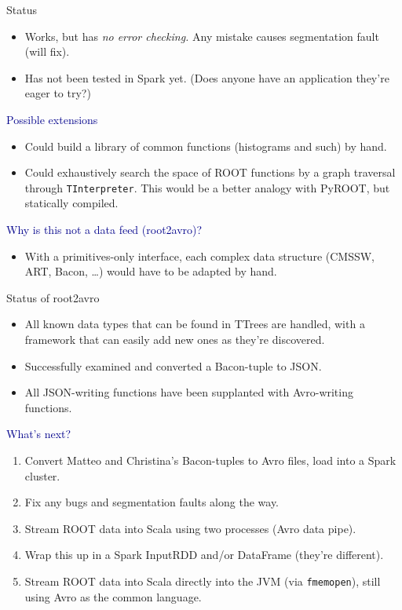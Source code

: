 \documentclass{beamer}
\begin{document}
\begin{frame}{Status}
\begin{itemize}
\item Works, but has {\it no error checking.} Any mistake causes segmentation fault (will fix).
\item Has not been tested in Spark yet. (Does anyone have an application they're eager to try?)
\end{itemize}

\vfill
\vfill
\hspace{-0.83 cm} \textcolor{darkblue}{\Large Possible extensions}
\begin{itemize}
\item Could build a library of common functions (histograms and such) by hand.
\item Could exhaustively search the space of ROOT functions by a graph traversal through {\tt TInterpreter}. This would be a better analogy with PyROOT, but statically compiled.
\end{itemize}

\vfill
\vfill
\hspace{-0.83 cm} \textcolor{darkblue}{\Large Why is this not a data feed (root2avro)?}
\begin{itemize}
\item With a primitives-only interface, each complex data structure (CMSSW, ART, Bacon, \ldots) would have to be adapted by hand.
\end{itemize}
\end{frame}

\begin{frame}{Status of root2avro}
\begin{itemize}
\item All known data types that can be found in TTrees are handled, with a framework that can easily add new ones as they're discovered.
\item Successfully examined and converted a Bacon-tuple to JSON.
\item All JSON-writing functions have been supplanted with Avro-writing functions.
\end{itemize}

\vfill
\vfill
\hspace{-0.83 cm} \textcolor{darkblue}{\Large What's next?}
\begin{enumerate}
\item Convert Matteo and Christina's Bacon-tuples to Avro files, load into a Spark cluster.
\item Fix any bugs and segmentation faults along the way.
\item Stream ROOT data into Scala using two processes (Avro data pipe).
\item Wrap this up in a Spark InputRDD and/or DataFrame (they're different).
\item Stream ROOT data into Scala directly into the JVM (via {\tt fmemopen}), still using Avro as the common language.
\end{enumerate}
\end{frame}
\end{document}
